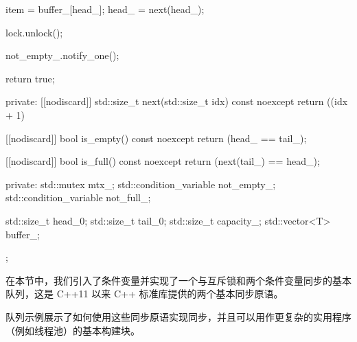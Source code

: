 \begin{cpp}
{{{        item = buffer_[head_];
        head_ = next(head_);

        lock.unlock();

        not_empty_.notify_one();

        return true;
    }

private:
    [[nodiscard]] std::size_t next(std::size_t idx) const noexcept {
        return ((idx + 1) %
    }

    [[nodiscard]] bool is_empty() const noexcept { return (head_ ==
    tail_); }

    [[nodiscard]] bool is_full() const noexcept { return (next(tail_)
    == head_); }

private:
    std::mutex mtx_;
    std::condition_variable not_empty_;
    std::condition_variable not_full_;

    std::size_t head_{0};
    std::size_t tail_{0};
    std::size_t capacity_;
    std::vector<T> buffer_;
};
}
\end{cpp}

在本节中，我们引入了条件变量并实现了一个与互斥锁和两个条件变量同步的基本队列，这是 C++11 以来 C++ 标准库提供的两个基本同步原语。

队列示例展示了如何使用这些同步原语实现同步，并且可以用作更复杂的实用程序（例如线程池）的基本构建块。










